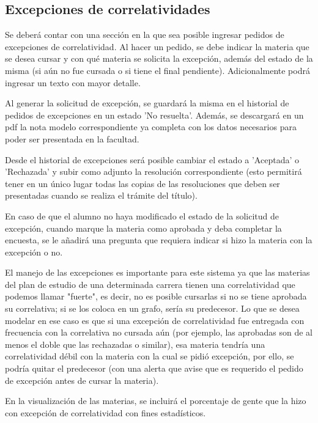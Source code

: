 \documentclass[a4paper]{article}
\begin{document}
\subsection{Excepciones de correlatividades}

Se deberá contar con una sección en la que sea posible ingresar pedidos de excepciones de correlatividad. Al hacer un pedido, se debe indicar la materia que se desea cursar y con qué materia se solicita la excepción, además del estado de la misma (si aún no fue cursada o si tiene el final pendiente). Adicionalmente podrá ingresar un texto con mayor detalle.

Al generar la solicitud de excepción, se guardará la misma en el historial de pedidos de excepciones en un estado 'No resuelta'. Además, se descargará en un pdf la nota modelo correspondiente ya completa con los datos necesarios para poder ser presentada en la facultad.

Desde el historial de excepciones será posible cambiar el estado a 'Aceptada' o 'Rechazada' y subir como adjunto la resolución correspondiente (esto permitirá tener en un único lugar todas las copias de las resoluciones que deben ser presentadas cuando se realiza el trámite del título).\newline


En caso de que el alumno no haya modificado el estado de la solicitud de excepción, cuando marque la materia como aprobada y deba completar la encuesta, se le añadirá una pregunta que requiera indicar si hizo la materia con la excepción o no.\newline


El manejo de las excepciones es importante para este sistema ya que las materias del plan de estudio de una determinada carrera tienen una correlatividad que podemos llamar "fuerte", es decir, no es posible cursarlas si no se tiene aprobada su correlativa; si se los coloca en un grafo, sería su predecesor. Lo que se desea modelar en ese caso es que si una excepción de correlatividad fue entregada con frecuencia con la correlativa no cursada aún (por ejemplo, las aprobadas son de al menos el doble que las rechazadas o similar), esa materia tendría una correlatividad débil con la materia con la cual se pidió excepción, por ello, se podría quitar el predecesor (con una alerta que avise que es requerido el pedido de excepción antes de cursar la materia).\newline


En la visualización de las materias, se incluirá el porcentaje de gente que la hizo con excepción de correlatividad con fines estadísticos.
\end{document}
